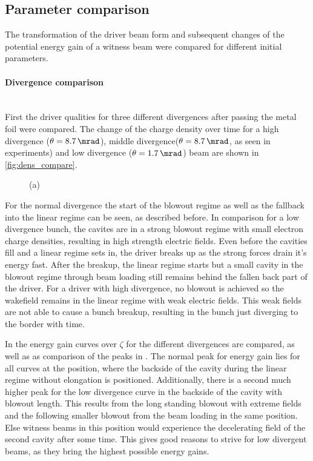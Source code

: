 \documentclass[bachelor_thesis]{subfiles}
\begin{document}
\subsection{Parameter comparison}
The transformation of the driver beam form and subsequent changes of the potential energy gain of a witness beam were compared for different initial parameters.
\paragraph*{Divergence comparison}\hspace{0pt} \\
First the driver qualities for three different divergences after passing the metal foil were compared. The change of the charge density over time
for a high divergence ($\theta=\qty{8.7}{\mrad}$), middle divergence($\theta=\qty{8.7}{\mrad}$, as seen in experiments) and low divergence ($\theta=\qty{1.7}{\mrad}$) beam are shown in \autoref{fig:dens_compare}.
\begin{figure}
	\centering
	\begin{subfigure}{0.5\textwidth}
	\centering
	\missingfigure{}
	\caption{} \label{fig:dens_low}
	\end{subfigure}
	\hfill
	\begin{subfigure}{0.5\textwidth}
	\centering
	\missingfigure{}
	\caption{} \label{fig:dens_high}
	\end{subfigure}
	\caption{(a) }
	\label{fig:dens_compare}
\end{figure}
For the normal divergence the start of the blowout regime as well as the fallback into the linear regime can be seen, as described before.
In comparison for a low divergence bunch, the cavites are in a strong blowout regime with small electron charge densities, resulting in high strength electric fields. Even before the cavities fill and a linear regime sets in, the driver breaks up
as the strong forces drain it's energy fast. After the breakup, the linear regime starts but a small cavity in the blowout regime through beam loading still remains behind the fallen back part of the driver.
For a driver with high divergence, no blowout is achieved so the wakefield remains in the linear regime with weak electric fields. This weak fields are not able to cause a bunch breakup, resulting in the bunch just diverging to the border with time.

In  the energy gain curves over $\zeta$ for the different divergences are compared, as well as as comparison of the peaks in .
The normal peak for energy gain lies for all curves at the position, where the backside of the cavity during the linear regime without elongation is positioned. Additionally, there is a second much higher peak for the low divergence curve
in the backside of the cavity with blowout length. This results from the long standing blowout with extreme fields and the following smaller blowout from the beam loading in the same position. Else witness beams in this position would experience the decelerating
field of the second cavity after some time. This gives good reasons to strive for low divergent beams, as they bring the highest possible energy gains.
\end{document}
